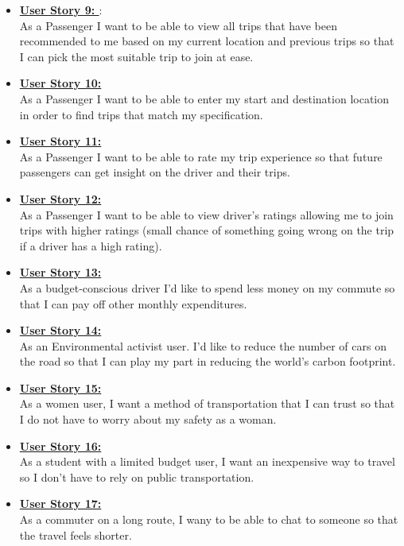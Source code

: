 \documentclass[hidelinks, 12pt, a4paper]{article}
\begin{document}
\begin{changemargin}
\begin{itemize}
        \item \textbf{\underline{User Story 9: }}: \\
       As a Passenger I want to be able to view all trips that have been recommended to me based on my current location and previous trips so that I can pick the most suitable trip to join at ease.
        \item \textbf{\underline{User Story 10: }} \\
       As a Passenger I want to be able to enter my start and destination location in order to find trips that match my specification.
        \item \textbf{\underline{User Story 11: }} \\
       As a Passenger I want to be able to rate my trip experience so that future passengers can get insight on the driver and their trips.
        \item \textbf{\underline{User Story 12: }} \\
        As a Passenger I want to be able to view driver's ratings allowing me to join trips with higher ratings (small chance of something going wrong on the trip if a driver has a high rating).
        \item \textbf{\underline{User Story 13: }} \\
       As a budget-conscious driver  I'd like to spend less money on my commute so that I can pay off other monthly expenditures. 
        \item \textbf{\underline{User Story 14: }} \\
        As an Environmental activist user. I'd like to reduce the number of cars on the road so that I can play my part in reducing the world’s carbon footprint.
        \item \textbf{\underline{User Story 15: }} \\
        As a women user, I want a method of transportation that I can trust so that I do not have to worry about my safety as a woman.
        \item \textbf{\underline{User Story 16: }} \\ 
        As a student with a limited budget user, I want an inexpensive way to travel so I don't have to rely on public transportation.
        \item \textbf{\underline{User Story 17: }} \\ 
        As a commuter on a long route, I wany to be able to chat to someone so that the travel feels shorter.
        
        
    \end{itemize}
  \end{changemargin}
  
\end{document}
